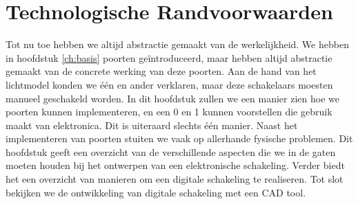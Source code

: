 \chapter{Technologische Randvoorwaarden}
\begin{chapterintro}
Tot nu toe hebben we altijd abstractie gemaakt van de werkelijkheid. We hebben in hoofdstuk \ref{ch:basis} poorten ge\"introduceerd, maar hebben altijd abstractie gemaakt van de concrete werking van deze poorten. Aan de hand van het lichtmodel konden we \'e\'en en ander verklaren, maar deze schakelaars moesten manueel geschakeld worden. In dit hoofdstuk zullen we een manier zien hoe we poorten kunnen implementeren, en een 0 en 1 kunnen voorstellen die gebruik maakt van elektronica. Dit is uiteraard slechts \'e\'en manier. Naast het implementeren van poorten stuiten we vaak op allerhande fysische problemen. Dit hoofdstuk geeft een overzicht van de verschillende aspecten die we in de gaten moeten houden bij het ontwerpen van een elektronische schakeling. Verder biedt het een overzicht van manieren om een digitale schakeling te realiseren. Tot slot bekijken we de ontwikkeling van digitale schakeling met een CAD tool.
\end{chapterintro}
\minitoc[n]
